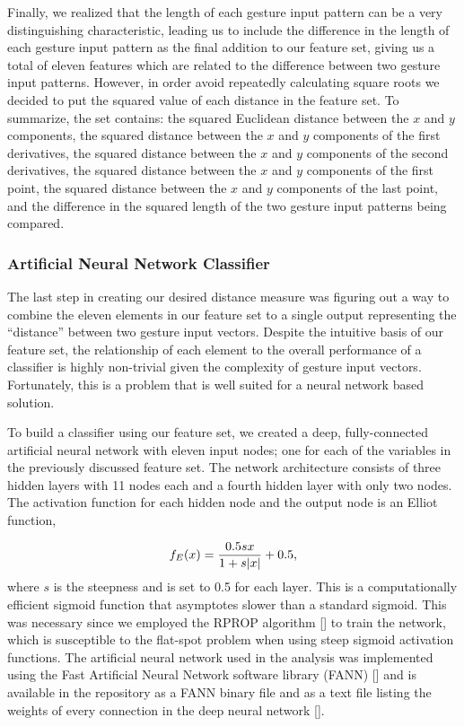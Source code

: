 \documentclass[final,1p,times,authoryear]{elsarticle}
\begin{document}
Finally, we realized that the length of each gesture input pattern can be
a very distinguishing characteristic, leading us to include the difference
in the length of each gesture input pattern as the final addition to our feature
set, giving us a total of eleven features which are related to the
difference between two gesture input patterns. However, in order avoid repeatedly
calculating square roots we decided to put the squared value of each
distance in the feature set. To summarize, the set contains: the squared
Euclidean distance between the $x$ and $y$ components, the squared distance
between the $x$ and $y$ components of the first derivatives, the squared 
distance between the $x$ and $y$ components of the second derivatives,
the squared distance between the $x$ and $y$ components of the first
point, the squared distance between the $x$ and $y$ components of
the last point, and the difference in the squared length of the two
gesture input patterns being compared.

\subsubsection{Artificial Neural Network Classifier}
The last step in creating our desired distance measure was figuring
out a way to combine the eleven elements in our feature set to a single
output representing the ``distance'' between two gesture input vectors.
Despite the intuitive basis of our feature set, the relationship of
each element to the overall performance of a classifier is highly
non-trivial given the complexity of gesture input vectors. Fortunately,
this is a problem that is well suited for a neural network based solution.

To build a classifier using our feature set, we created a deep, fully-connected
artificial neural network with eleven input nodes; one for each of
the variables in the previously discussed feature set. The network
architecture consists of three hidden layers with 11 nodes each and
a fourth hidden layer with only two nodes. The activation function
for each hidden node and the output node is an Elliot function,

\begin{equation}
\begin{centering}
f_{E}(x)=\frac{0.5sx}{1+s|x|}+0.5,
\end{centering}
\end{equation}
where $s$ is the steepness and is set to 0.5 for each layer. This
is a computationally efficient sigmoid function that asymptotes
slower than a standard sigmoid. This was necessary since we employed
the RPROP algorithm [\cite{rprop}] to train the network, which is
susceptible to the flat-spot problem when using steep sigmoid activation
functions. The artificial neural network used in the analysis was
implemented using the Fast Artificial Neural Network software library
(FANN) [\cite{nissen03}] and is available in the repository as a FANN binary
file and as a text file listing the weights of every connection in the deep neural network [\cite{dodona}].
\end{document}
